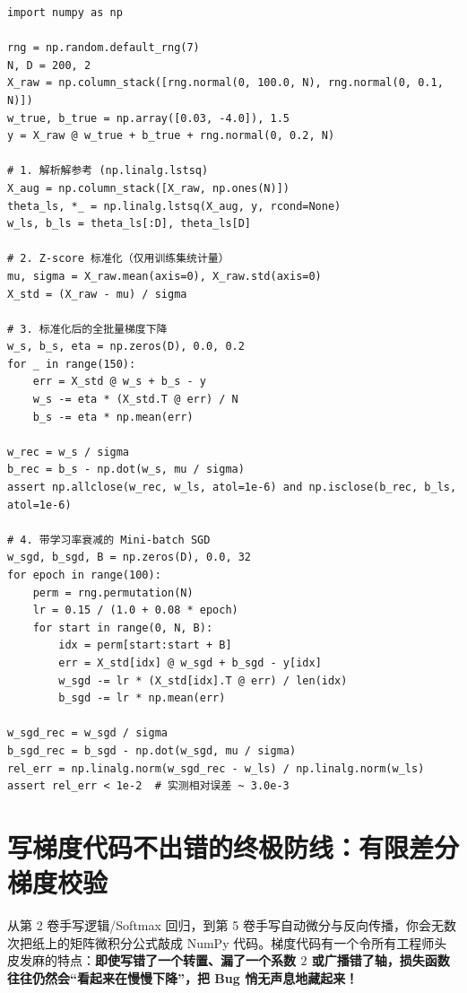 \begin{lstlisting}[caption={标准化全批量 GD 与 Mini-batch SGD 线性回归（对比 \texttt{lstsq} 校验）},label={lst:ch6-gd-sgd}]
import numpy as np

rng = np.random.default_rng(7)
N, D = 200, 2
X_raw = np.column_stack([rng.normal(0, 100.0, N), rng.normal(0, 0.1, N)])
w_true, b_true = np.array([0.03, -4.0]), 1.5
y = X_raw @ w_true + b_true + rng.normal(0, 0.2, N)

# 1. 解析解参考 (np.linalg.lstsq)
X_aug = np.column_stack([X_raw, np.ones(N)])
theta_ls, *_ = np.linalg.lstsq(X_aug, y, rcond=None)
w_ls, b_ls = theta_ls[:D], theta_ls[D]

# 2. Z-score 标准化（仅用训练集统计量）
mu, sigma = X_raw.mean(axis=0), X_raw.std(axis=0)
X_std = (X_raw - mu) / sigma

# 3. 标准化后的全批量梯度下降
w_s, b_s, eta = np.zeros(D), 0.0, 0.2
for _ in range(150):
    err = X_std @ w_s + b_s - y
    w_s -= eta * (X_std.T @ err) / N
    b_s -= eta * np.mean(err)

w_rec = w_s / sigma
b_rec = b_s - np.dot(w_s, mu / sigma)
assert np.allclose(w_rec, w_ls, atol=1e-6) and np.isclose(b_rec, b_ls, atol=1e-6)

# 4. 带学习率衰减的 Mini-batch SGD
w_sgd, b_sgd, B = np.zeros(D), 0.0, 32
for epoch in range(100):
    perm = rng.permutation(N)
    lr = 0.15 / (1.0 + 0.08 * epoch)
    for start in range(0, N, B):
        idx = perm[start:start + B]
        err = X_std[idx] @ w_sgd + b_sgd - y[idx]
        w_sgd -= lr * (X_std[idx].T @ err) / len(idx)
        b_sgd -= lr * np.mean(err)

w_sgd_rec = w_sgd / sigma
b_sgd_rec = b_sgd - np.dot(w_sgd, mu / sigma)
rel_err = np.linalg.norm(w_sgd_rec - w_ls) / np.linalg.norm(w_ls)
assert rel_err < 1e-2  # 实测相对误差 ~ 3.0e-3
\end{lstlisting}

\section{写梯度代码不出错的终极防线：有限差分梯度校验}
\label{sec:ch6-gradcheck}

从第 2 卷手写逻辑/Softmax 回归，到第 5 卷手写自动微分与反向传播，你会无数次把纸上的矩阵微积分公式敲成 NumPy 代码。梯度代码有一个令所有工程师头皮发麻的特点：\textbf{即使写错了一个转置、漏了一个系数 $2$ 或广播错了轴，损失函数往往仍然会“看起来在慢慢下降”，把 Bug 悄无声息地藏起来！}

